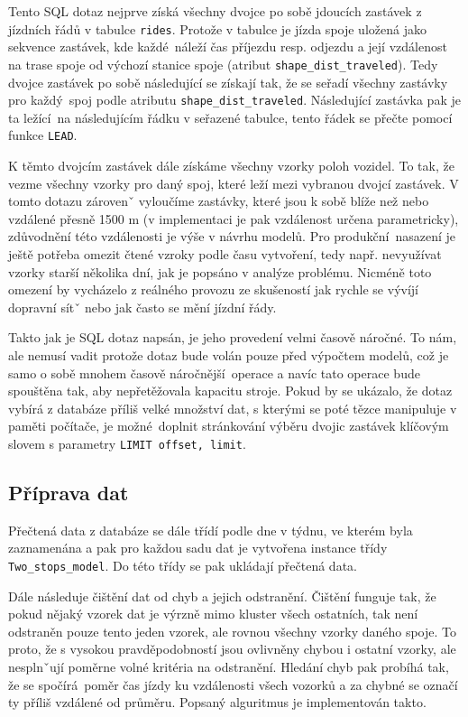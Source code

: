 Tento SQL dotaz nejprve získá všechny dvojce po sobě jdoucích zastávek z jízdních řádů v tabulce \verb-rides-. Protože v tabulce je jízda spoje uložená jako sekvence zastávek, kde každé náleží čas příjezdu resp. odjezdu a její vzdálenost na trase spoje od výchozí stanice spoje (atribut \verb-shape_dist_traveled-). Tedy dvojce zastávek po sobě následující se získají tak, že se seřadí všechny zastávky pro každý spoj podle atributu \verb-shape_dist_traveled-. Následující zastávka pak je ta ležící na následujícím řádku v seřazené tabulce, tento řádek se přečte pomocí funkce \verb-LEAD-.

\bigbreak

K těmto dvojcím zastávek dále získáme všechny vzorky poloh vozidel. To tak, že vezme všechny vzorky pro daný spoj, které leží mezi vybranou dvojcí zastávek. V tomto dotazu zárovenˇ vyloučíme zastávky, které jsou k sobě blíže než nebo vzdálené přesně 1500 m (v implementaci je pak vzdálenost určena parametricky), zdůvodnění této vzdálenosti je výše v návrhu modelů. Pro produkční nasazení je ještě potřeba omezit čtené vzroky podle času vytvoření, tedy např. nevyužívat vzorky starší několika dní, jak je popsáno v analýze problému. Nicméně toto omezení by vycházelo z reálného provozu ze skušeností jak rychle se vývíjí dopravní sítˇ nebo jak často se mění jízdní řády.

\bigbreak

Takto jak je SQL dotaz napsán, je jeho provedení velmi časově náročné. To nám, ale nemusí vadit protože dotaz bude volán pouze před výpočtem modelů, což je samo o sobě mnohem časově náročnější operace a navíc tato operace bude spouštěna tak, aby nepřetěžovala kapacitu stroje. Pokud by se ukázalo, že dotaz vybírá z databáze příliš velké množství dat, s kterými se poté tězce manipuluje v paměti počítače, je možné doplnit stránkování výběru dvojic zastávek klíčovým slovem s parametry \verb-LIMIT offset, limit-.

\subsection{Příprava dat}

Přečtená data z databáze se dále třídí podle dne v týdnu, ve kterém byla zaznamenána a pak pro každou sadu dat je vytvořena instance třídy \verb-Two_stops_model-. Do této třídy se pak ukládají přečtená data.

\bigbreak

Dále následuje čištění dat od chyb a jejich odstranění. Čištění funguje tak, že pokud nějaký vzorek dat je výrzně mimo kluster všech ostatních, tak není odstraněn pouze tento jeden vzorek, ale rovnou všechny vzorky daného spoje. To proto, že s vysokou pravděpodobností jsou ovlivněny chybou i ostatní vzorky, ale nesplnˇují poměrne volné kritéria na odstranění. Hledání chyb pak probíhá tak, že se spočírá poměr čas jízdy ku vzdálenosti všech vozorků a za chybné se označí ty příliš vzdálené od průměru. Popsaný alguritmus je implementován takto.

